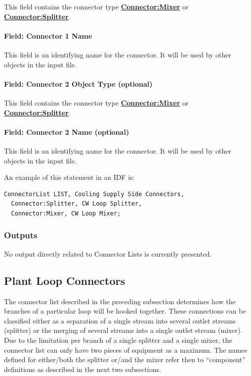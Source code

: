 This field contains the connector type \textbf{\hyperref[connectormixer]{Connector:Mixer}} or \textbf{\hyperref[connectorsplitter]{Connector:Splitter}}.

\paragraph{Field: Connector 1 Name}\label{field-connector-1-name}

This field is an identifying name for the connector. It will be used by other objects in the input file.

\paragraph{Field: Connector 2 Object Type (optional)}\label{field-connector-2-object-type-optional}

This field contains the connector type \textbf{\hyperref[connectormixer]{Connector:Mixer}} or \textbf{\hyperref[connectorsplitter]{Connector:Splitter}}.

\paragraph{Field: Connector 2 Name (optional)}\label{field-connector-2-name-optional}

This field is an identifying name for the connector. It will be used by other objects in the input file.

An example of this statement in an IDF is:

\begin{lstlisting}
ConnectorList LIST, Cooling Supply Side Connectors,
  Connector:Splitter, CW Loop Splitter,
  Connector:Mixer, CW Loop Mixer;
\end{lstlisting}

\subsubsection{Outputs}\label{outputs-3-012}

No output directly related to Connector Lists is currently presented.

\subsection{Plant Loop Connectors}\label{plant-loop-connectors}

The connector list described in the preceding subsection determines how the branches of a particular loop will be hooked together. These connections can be classified either as a separation of a single stream into several outlet streams (splitter) or the merging of several streams into a single outlet stream (mixer). Due to the limitation per branch of a single splitter and a single mixer, the connector list can only have two pieces of equipment as a maximum. The names defined for either/both the splitter or/and the mixer refer then to ``component'' definitions as described in the next two subsections.

